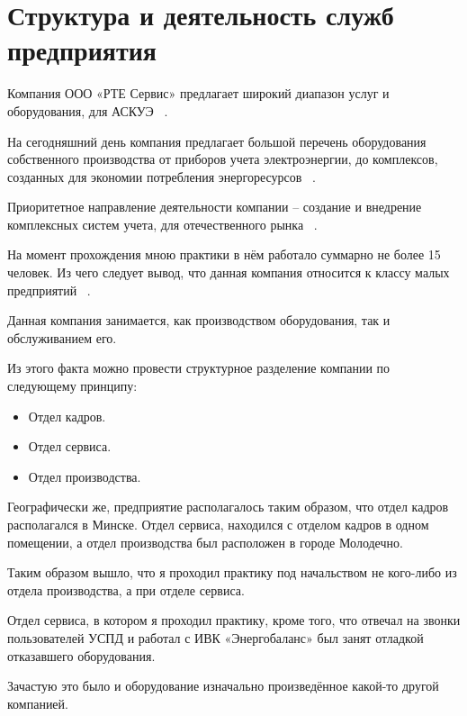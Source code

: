\section{Структура и деятельность служб предприятия}

Компания ООО «РТЕ Сервис» 
предлагает широкий диапазон услуг и оборудования, для АСКУЭ ~\cite{rte-about}.

На сегодняшний день компания предлагает
большой перечень оборудования собственного производства
от приборов учета электроэнергии,
до комплексов, созданных для экономии потребления энергоресурсов ~\cite{rte-about}.

Приоритетное направление деятельности компании – создание и внедрение комплексных систем учета,
для отечественного рынка  ~\cite{rte-about}.


На момент прохождения мною практики
в нём работало суммарно не более 15 человек.
Из чего следует вывод,
что данная компания относится к классу малых предприятий ~\cite{mal-biznes-ru}.


Данная компания занимается, как производством оборудования,
так и обслуживанием его.

Из этого факта можно провести структурное разделение компании
по следующему принципу:
\begin{itemize}
\item Отдел кадров.
\item Отдел сервиса.
\item Отдел производства.
\end{itemize}

Географически же, предприятие располагалось таким образом,
что отдел кадров располагался в Минске. Отдел сервиса,
находился с отделом кадров в одном помещении, а отдел
производства был расположен в городе Молодечно.

Таким образом вышло,
что я проходил практику под начальством не кого-либо из отдела производства,
а при отделе сервиса.

Отдел сервиса, в котором я проходил практику, кроме того,
что отвечал на звонки пользователей УСПД и работал с
ИВК «Энергобаланс» был занят отладкой отказавшего
оборудования.

Зачастую это было и оборудование изначально произведённое
какой-то другой компанией.

\newpage

